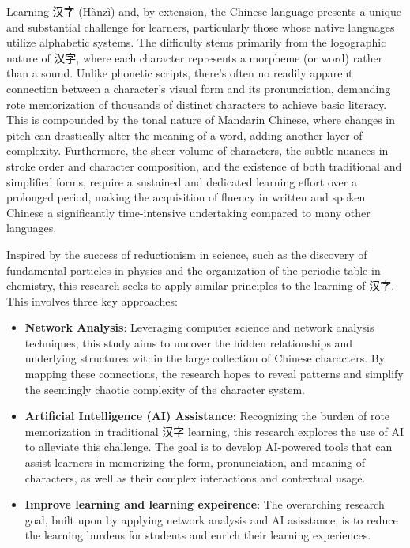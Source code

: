 \documentclass[11pt,letterpaper]{article}
\begin{document}
Learning 汉字 (Hànzì) and, by extension, the Chinese language presents a
unique and substantial challenge for learners, particularly those whose
native languages utilize alphabetic systems. The difficulty stems
primarily from the logographic nature of 汉字, where each character
represents a morpheme (or word) rather than a sound. Unlike phonetic
scripts, there's often no readily apparent connection between a
character's visual form and its pronunciation, demanding rote
memorization of thousands of distinct characters to achieve basic
literacy. This is compounded by the tonal nature of Mandarin Chinese,
where changes in pitch can drastically alter the meaning of a word,
adding another layer of complexity. Furthermore, the sheer volume of
characters, the subtle nuances in stroke order and character
composition, and the existence of both traditional and simplified forms,
require a sustained and dedicated learning effort over a prolonged
period, making the acquisition of fluency in written and spoken Chinese
a significantly time-intensive undertaking compared to many other
languages.

Inspired by the success of reductionism in science, such as the
discovery of fundamental particles in physics and the organization of
the periodic table in chemistry, this research seeks to apply similar
principles to the learning of 汉字. This involves three key approaches:

\begin{itemize}
\item
  \textbf{Network Analysis}: Leveraging computer science and network
  analysis techniques, this study aims to uncover the hidden
  relationships and underlying structures within the large collection of
  Chinese characters. By mapping these connections, the research hopes
  to reveal patterns and simplify the seemingly chaotic complexity of
  the character system.
\item
  \textbf{Artificial Intelligence (AI) Assistance}: Recognizing the
  burden of rote memorization in traditional 汉字 learning, this
  research explores the use of AI to alleviate this challenge. The goal
  is to develop AI-powered tools that can assist learners in memorizing
  the form, pronunciation, and meaning of characters, as well as their
  complex interactions and contextual usage.
\item
  \textbf{Improve learning and learning expeirence}: The overarching
  research goal, built upon by applying network analysis and AI
  asisstance, is to reduce the learning burdens for students and enrich
  their learning experiences.
\end{itemize}
\end{document}
